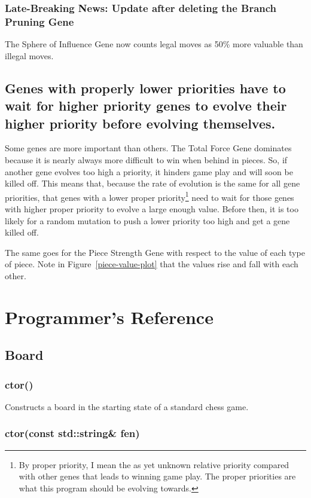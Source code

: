 \documentclass[letterpaper]{article}
\renewcommand\_{\textunderscore\allowbreak}
\begin{document}
\subsubsection{Late-Breaking News: Update after deleting the Branch Pruning Gene}
The Sphere of Influence Gene now counts legal moves as 50\% more valuable than illegal moves.

\subsection{Genes with properly lower priorities have to wait for higher priority genes to evolve their higher priority before evolving themselves.}
\label{lower-priority-waits}

Some genes are more important than others. The Total Force Gene dominates because it is nearly always more difficult to win when behind in pieces. So, if another gene evolves too high a priority, it hinders game play and will soon be killed off. This means that, because the rate of evolution is the same for all gene priorities, that genes with a lower proper priority\footnote{By proper priority, I mean the as yet unknown relative priority compared with other genes that leads to winning game play. The proper priorities are what this program should be evolving towards.} need to wait for those genes with higher proper priority to evolve a large enough value. Before then, it is too likely for a random mutation to push a lower priority too high and get a gene killed off.

The same goes for the Piece Strength Gene with respect to the value of each type of piece. Note in Figure~\ref{piece-value-plot} that the values rise and fall with each other.

\section{Programmer's Reference}

\subsection{Board}

\subsubsection{ctor()}

Constructs a board in the starting state of a standard chess game.

\subsubsection[ctor(string)]{ctor(const std::string\& fen)}
\end{document}
